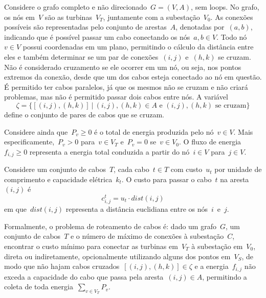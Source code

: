 \begin{sloppypar}

Considere o grafo completo e não direcionado~$G=(V, A)$, sem loops.
No grafo, os nós em~$V$ são as turbinas~$V_{T}$, juntamente com a subestação~$V_{0}$.
As conexões possíveis são representadas pelo conjunto de arestas~$A$, denotadas por~$(a, b)$, indicando que é possível passar um cabo conectando os nós~$a, b \in V$.
Todo nó~$v \in V$ possui coordenadas em um plano, permitindo o cálculo da distância entre eles e também determinar se um par de conexões~$(i, j)$ e~$(h, k)$ se cruzam.
Não é considerado cruzamento se ele ocorrer em um nó, ou seja, nos pontos extremos da conexão, desde que um dos cabos esteja conectado ao nó em questão.
É permitido ter cabos paralelos, já que os mesmos não se cruzam e não criará problemas, mas não é permitido passar dois cabos entre nós.
A variável~
\[\zeta = \{[(i, j), (h, k)]\ |\ (i, j), (h, k) \in A \text{ e } (i, j), (h, k) \text{ se cruzam}\}\]
define o conjunto de pares de cabos que se cruzam.

Considere ainda que~$P_v \geq 0$ é o total de energia produzida pelo nó~$v \in V$.
Mais especificamente,~$P_{v} > 0$ para~$v \in V_{T}$ e~$P_{v} = 0$ se~$v \in V_{0}$. %
O fluxo de energia~$f_{i, j} \geq 0$ representa a energia total conduzida a partir do nó~$i \in V$ para~$j \in V$.

Considere um conjunto de cabos~$T$, cada cabo~$t \in T$ com custo~$u_{t}$ por unidade de comprimento e capacidade elétrica~$k_{t}$.
O custo para passar o cabo~$t$ na aresta~$(i, j)$ é~
\[c_{i, j}^{t}=u_{t} \cdot dist(i, j)\]
em que~$dist(i, j)$ representa a distância euclidiana entre os nós~$i$~e~$j$.

Formalmente, o problema de roteamento de cabos é: dado um grafo~$G$, um conjunto de cabos~$T$ e o número de máximo de conexões à subestação~$C$,
encontrar o custo mínimo para conectar as turbinas em~$V_{T}$ à subestação em~$V_{0}$, direta ou indiretamente, opcionalmente utilizando alguns dos pontos em~$V_{S}$,
de modo que não hajam cabos cruzados~$[(i, j), (h, k)] \in \zeta$ e a energia~$f_{i, j}$ não exceda a capacidade do cabo que passa pela aresta~$(i, j) \in A$,
permitindo a coleta de toda energia~$\sum_{v \in V_{T}}{P_{v}}$.

\end{sloppypar}

